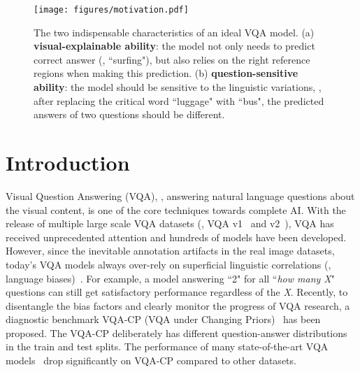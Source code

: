 \documentclass[10pt,twocolumn,letterpaper]{article}
\begin{document}
\begin{figure}[tbp]
	\centering
	\texttt{[image: figures/motivation.pdf]}
	\caption{The two indispensable characteristics of an ideal VQA model. (a) \textbf{visual-explainable ability}: the model not only needs to predict correct answer (\eg, ``surfing"), but also relies on the right reference regions when making this prediction. (b) \textbf{question-sensitive ability}: the model should be sensitive to the linguistic variations, \eg, after replacing the critical word ``luggage" with ``bus", the predicted answers of two questions should be different.}
	\label{fig:1}
\end{figure}

\section{Introduction} \label{sec:intro}
Visual Question Answering (VQA), \ie, answering natural language questions about the visual content, is one of the core techniques towards complete AI. With the release of multiple large scale VQA datasets (\eg, VQA v1~\cite{antol2015vqa} and v2~\cite{goyal2017making}), VQA has received unprecedented attention and hundreds of models have been developed. However, since the inevitable annotation artifacts in the real image datasets, today's VQA models always over-rely on superficial linguistic correlations (\ie, language biases)~\cite{agrawal2016analyzing, zhang2016yin, johnson2017clevr, goyal2017making}. For example, a model answering ``2" for all ``\textit{how many X}" questions can still get satisfactory performance regardless of the \textit{X}. Recently, to disentangle the bias factors and clearly monitor the progress of VQA research, a diagnostic benchmark VQA-CP (VQA under Changing Priors)~\cite{agrawal2018don} has been proposed. The VQA-CP deliberately has different question-answer distributions in the train and test splits. The performance of many state-of-the-art VQA models~\cite{andreas2016neural, fukui2016multimodal, yang2016stacked, anderson2018bottom} drop significantly on VQA-CP compared to other datasets.
\end{document}
